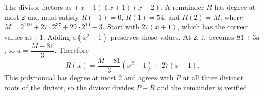 The divisor factors as $(x-1)(x+1)(x-2)$. A remainder $R$ has degree at most 2 and must satisfy $R(-1)=0$, $R(1)=54$, and $R(2)=M$, where $M=2^{100}+27\cdot2^{37}+29\cdot2^{10}-3$. Start with $27(x+1)$, which has the correct values at $\pm1$. Adding $a(x^2-1)$ preserves those values. At 2, it becomes $81+3a$, so $a=\dfrac{M-81}{3}$. Therefore\[\boxed{R(x)=\dfrac{M-81}{3}(x^2-1)+27(x+1)}.\]This polynomial has degree at most 2 and agrees with $P$ at all three distinct roots of the divisor, so the divisor divides $P-R$ and the remainder is verified.
